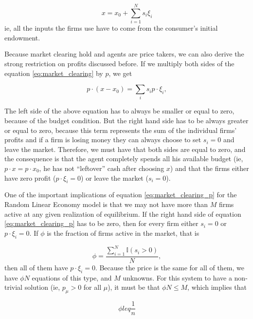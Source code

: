 \begin{equation}
x = x_0 + \sum_{i=1}^N s_i \xi_i
\label{eq:market_clearing}
\end{equation}
ie, all the inputs the firms use have to come from the consumer's
initial endowment. 

Because market clearing hold and agents are price takers, we can also
derive the strong restriction on profits discussed before. If we
multiply both sides of the equation \eqref{eq:market_clearing} by $p$,
we get

\begin{equation}
  \label{eq:market_clearing_p}
  p\cdot (x - x_0) = \sum_i s_i p \cdot \xi_i,
\end{equation}

The left side of the above equation has to always be smaller or equal
to zero, because of the budget condition. But the right hand side has
to be always greater or equal to zero, because this term represents
the sum of the individual firms' profits and if a firm is losing money
they can always choose to set $s_i = 0$ and leave the
market. Therefore, we must have that both sides are equal to zero, and
the consequence is that the agent completely spends all his available
budget (ie, $p\cdot x = p \cdot x_0$, he has not ``leftover'' cash
after choosing $x$) and that the firms either have zero profit
($p\cdot \xi_i = 0$) or leave the market ($s_i = 0$).

One of the important implications of equation
\eqref{eq:market_clearing_p} for the Random Linear Economy model is
that we may not have more than $M$ firms active at any given
realization of equilibrium. If the right hand side of equation
\eqref{eq:market_clearing_p} has to be zero, then for every firm
either $s_i = 0$ or $p\cdot \xi_i = 0$. If $\phi$ is the fraction of
firms active in the market, that is

\begin{equation}
  \label{eq:phi_def}
  \phi = \frac{\sum_{i=1}^N \mathds{I}(s_i > 0)}{N},
\end{equation}
then all of them have $p\cdot \xi_i = 0$. Because the price is the
same for all of them, we have $\phi N$ equations of this type, and $M$
unknowns. For this system to have a non-trivial solution (ie,
$p_\mu > 0$ for all $\mu$), it must be that $\phi N \leq M$, which
implies that

\begin{equation}
  \label{eq:4}
  \phi leq \frac{1}{n}
\end{equation}

